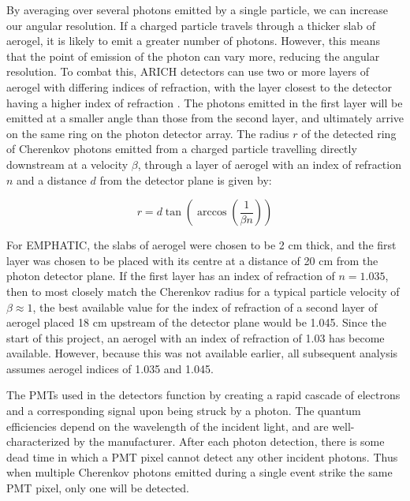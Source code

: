By averaging over several photons emitted by a single particle, we can increase our angular resolution.
If a charged particle travels through a thicker slab of aerogel, it is likely to emit a greater number of photons.
However, this means that the point of emission of the photon can vary more, reducing the angular resolution.
To combat this, ARICH detectors can use two or more layers of aerogel with differing indices of refraction, with the layer closest to the detector having a higher index of refraction \cite{belleArich}.
The photons emitted in the first layer will be emitted at a smaller angle than those from the second layer, and ultimately arrive on the same ring on the photon detector array.
The radius $r$ of the detected ring of Cherenkov photons emitted from a charged particle travelling directly downstream at a velocity $\beta$, through a layer of aerogel with an index of refraction $n$ and a distance $d$ from the detector plane is given by:

\begin{equation}
r = d\tan\left(\arccos\left(\frac{1}{\beta n}\right)\right)
\end{equation}

For EMPHATIC, the slabs of aerogel were chosen to be 2 cm thick, and the first layer was chosen to be placed with its centre at a distance of 20 cm from the photon detector plane.
If the first layer has an index of refraction of $n = 1.035$, then to most closely match the Cherenkov radius for a typical particle velocity of $\beta \approx 1$, the best available value for the index of refraction of a second layer of aerogel placed 18 cm upstream of the detector plane would be 1.045. 
Since the start of this project, an aerogel with an index of refraction of 1.03 has become available.
However, because this was not available earlier, all subsequent analysis assumes aerogel indices of 1.035 and 1.045.

The PMTs used in the detectors function by creating a rapid cascade of electrons and a corresponding signal upon being struck by a photon.
The quantum efficiencies depend on the wavelength of the incident light, and are well-characterized by the manufacturer.
After each photon detection, there is some dead time in which a PMT pixel cannot detect any other incident photons.
Thus when multiple Cherenkov photons emitted during a single event strike the same PMT pixel, only one will be detected.

